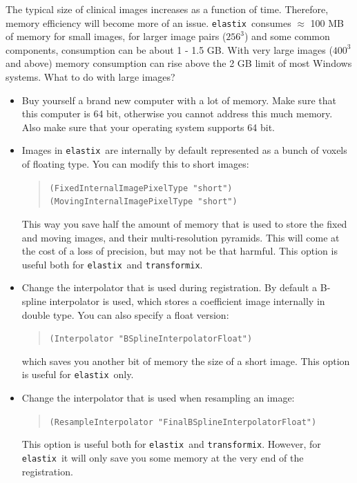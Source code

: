 \documentclass[]{report}
\newcommand{\elastix}{\texttt{elastix}}
\newcommand{\transformix}{\texttt{transformix}}
\begin{document}
The typical size of clinical images increases as a function of time.
Therefore, memory efficiency will become more of an issue. \elastix\
consumes $\approx$ 100 MB of memory for small images, for larger
image pairs ($256^3$) and some common components, consumption can be
about 1 - 1.5 GB. With very large images ($400^3$ and above) memory
consumption can rise above the 2 GB limit of most Windows systems.
What to do with large images?
\begin{itemize}
\item Buy yourself a brand new computer with a lot of memory. Make
sure that this computer is 64 bit, otherwise you cannot address this
much memory. Also make sure that your operating system supports 64
bit.

\item Images in \elastix\ are internally by default represented as a bunch of
voxels of floating type. You can modify this to short images:
\begin{quote}
\texttt{(FixedInternalImagePixelType "short")} \\
\texttt{(MovingInternalImagePixelType "short")}
\end{quote}
This way you save half the amount of memory that is used to store the
fixed and moving images, and their multi-resolution pyramids. This
will come at the cost of a loss of precision, but may not be that
harmful. This option is useful both for \elastix\ and \transformix.

\item Change the interpolator that is used during registration. By default a B-spline
interpolator is used, which stores a coefficient image internally in
double type. You can also specify a float version:
\begin{quote}
\texttt{(Interpolator "BSplineInterpolatorFloat")}
\end{quote}
which saves you another bit of memory the size of a short image. This
option is useful for \elastix\ only.

\item Change the interpolator that is used when resampling an image:
\begin{quote}
\texttt{(ResampleInterpolator "FinalBSplineInterpolatorFloat")}
\end{quote}
This option is useful both for \elastix\ and \transformix. However,
for \elastix\ it will only save you some memory at the very end of
the registration.

\end{itemize}
\end{document}
